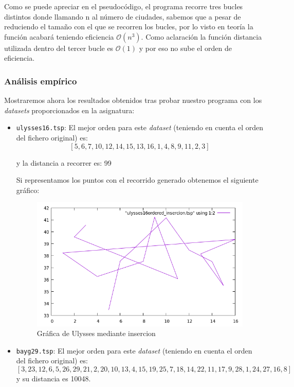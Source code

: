 \documentclass[10pt,a4paper]{article}
\begin{document}
Como se puede apreciar en el pseudocódigo, el programa recorre tres bucles distintos donde llamando n al número de ciudades, sabemos que a pesar de reduciendo el tamaño con el que se recorren los bucles, por lo visto en teoría  la función acabará teniendo eficiencia \(\mathcal{O}(n^3)\). Como aclaración la función distancia utilizada dentro del tercer bucle es  \(\mathcal{O}(1)\) y por eso no sube el orden de eficiencia.
  
  
\subsubsection*{Análisis empírico}
 Mostraremos ahora los resultados obtenidos tras probar nuestro programa con los \textit{datasets} proporcionados en la asignatura:

\begin{itemize}
	\item \texttt{ulysses16.tsp}: El mejor orden para este \textit{dataset} (teniendo en cuenta el orden del fichero original) es:
	\[
		[5, 6, 7, 10, 12, 14, 15, 13, 16, 1, 4, 8, 9, 11, 2, 3]
	\]
	
	y la distancia a recorrer es: 99
	
	Si representamos los puntos con el recorrido generado obtenemos el siguiente gráfico:
	
	\begin{figure}[h!]
	\centering
	\includegraphics[scale=0.5]{./Images/ulysses_insercion.png}
	\caption{Gráfica de Ulysses mediante insercion}
	\end{figure}
	
	\newpage
	
	\item \texttt{bayg29.tsp}:  El mejor orden para este \textit{dataset} (teniendo en cuenta el orden del fichero original) es:
	\[
		[3, 23, 12, 6, 5, 26, 29, 21, 2, 20, 10, 13, 4, 15, 19, 25, 7, 18, 14, 22, 11, 17, 9, 28, 1, 24, 27, 16, 8
]
	\]
	y su distancia es 10048.


\end{itemize}
\end{document}
